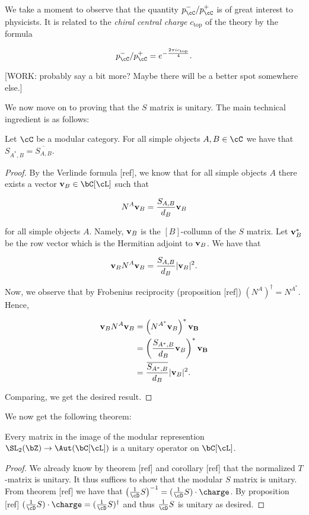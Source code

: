 We take a moment to observe that the quantity $p_{\cC}^-/p_{\cC}^+$ is of great interest to physicists. It is related to the \textit{chiral central charge} $c_{\text{top}}$ of the theory by the formula

$$p_{\cC}^-/p_{\cC}^{+}=e^{-\frac{2\pi i c_{\text{top}}}{4}}.$$

[WORK: probably say a bit more? Maybe there will be a better spot somewhere else.]

We now move on to proving that the $S$ matrix is unitary. The main technical ingredient is as follows:

\begin{prop} Let $\cC$ be a modular category. For all simple objects $A,B\in \cC$ we have that $S_{A^*,B}=\overline{S_{A,B}}$.
\end{prop}
\begin{proof} By the Verlinde formula [ref], we know that for all simple objects $A$ there exists a vector $\bold{v}_B\in \bC[\cL]$ such that

$$N^{A} \bold{v}_B= \frac{S_{A,B}}{d_B}\bold{v}_B$$

for all simple objects $A$. Namely, $\bold{v}_B$ is the $[B]$-collumn of the $S$ matrix. Let $\bold{v}_B^{*}$ be the row vector which is the Hermitian adjoint to $\bold{v}_B$. We have that

$$\bold{v}_{B}N^{A}\bold{v}_B=\frac{S_{A,B}}{d_B}|\bold{v}_B|^2.$$

Now, we observe that by Frobenius reciprocity (proposition [ref]) $(N^{A})^{\dagger}=N^{A^*}$. Hence,

\begin{align*}
\bold{v}_{B}N^{A}\bold{v}_B&=\left(N^{A^*}\bold{v}_B\right)^*\bold{v_B}\\
&=\left(\frac{S_{A^*,B}}{d_B}\bold{v}_B\right)^*\bold{v_B}\\
&=\frac{\overline{S_{A^*,B}}}{d_B}|\bold{v}_B|^2.
\end{align*}

Comparing, we get the desired result.

\end{proof}

We now get the following theorem:

\begin{thrm} Every matrix in the image of the modular represention $\SL_2(\bZ)\to \Aut(\bC[\cL])$ is a unitary operator on $\bC[\cL]$.
\end{thrm}
\begin{proof} We already know by theorem [ref] and corollary [ref] that the normalized $T$-matrix is unitary. It thus suffices to show that the modular $S$ matrix is unitary. From theorem [ref] we have that $\left(\frac{1}{\cD}S\right)^{-1} = (\frac{1}{\cD}S) \cdot \charge$. By proposition [ref] $(\frac{1}{\cD}S) \cdot \charge = (\frac{1}{\cD}S)^{\dagger}$ and thus $\frac{1}{\cD}S$ is unitary as desired.
\end{proof}

